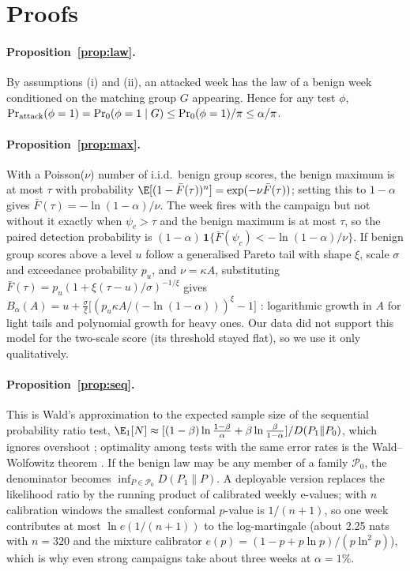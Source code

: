\section{Proofs}
\label{app:proofs}

\paragraph{Proposition~\ref{prop:law}.} By assumptions (i) and (ii), an attacked week has the law of a benign week conditioned on the matching group $G$ appearing. Hence for any test $\phi$, $\Pr_{\rm attack}(\phi=1)=\Pr_0(\phi=1\mid G)\le \Pr_0(\phi=1)/\pi\le\alpha/\pi$.

\paragraph{Proposition~\ref{prop:max}.} With a Poisson($\nu$) number of i.i.d.\ benign group scores, the benign maximum is at most $\tau$ with probability $\E[(1-\bar F(\tau))^n]=\exp(-\nu\bar F(\tau))$; setting this to $1-\alpha$ gives $\bar F(\tau)=-\ln(1-\alpha)/\nu$. The week fires with the campaign but not without it exactly when $\psi_c>\tau$ and the benign maximum is at most $\tau$, so the paired detection probability is $(1-\alpha)\,\mathbf 1\{\bar F(\psi_c)<-\ln(1-\alpha)/\nu\}$. If benign group scores above a level $u$ follow a generalised Pareto tail with shape $\xi$, scale $\sigma$ and exceedance probability $p_u$, and $\nu=\kappa A$, substituting $\bar F(\tau)=p_u(1+\xi(\tau-u)/\sigma)^{-1/\xi}$ gives $B_\alpha(A)=u+\frac{\sigma}{\xi}\bigl[(p_u\kappa A/(-\ln(1-\alpha)))^{\xi}-1\bigr]$ \citep{pickands1975statistical,coles2001introduction}: logarithmic growth in $A$ for light tails and polynomial growth for heavy ones. Our data did not support this model for the two-scale score (its threshold stayed flat), so we use it only qualitatively.

\paragraph{Proposition~\ref{prop:seq}.} This is Wald's approximation to the expected sample size of the sequential probability ratio test, $\E_1[N]\approx[(1-\beta)\ln\frac{1-\beta}{\alpha}+\beta\ln\frac{\beta}{1-\alpha}]/D(P_1\|P_0)$, which ignores overshoot \citep{wald1945sequential}; optimality among tests with the same error rates is the Wald--Wolfowitz theorem \citep{wald1948optimum}. If the benign law may be any member of a family $\mathcal P_0$, the denominator becomes $\inf_{P\in\mathcal P_0}D(P_1\|P)$. A deployable version replaces the likelihood ratio by the running product of calibrated weekly e-values; with $n$ calibration windows the smallest conformal $p$-value is $1/(n+1)$, so one week contributes at most $\ln e(1/(n+1))$ to the log-martingale (about 2.25 nats with $n=320$ and the mixture calibrator $e(p)=(1-p+p\ln p)/(p\ln^2 p)$), which is why even strong campaigns take about three weeks at $\alpha=1\%$.

